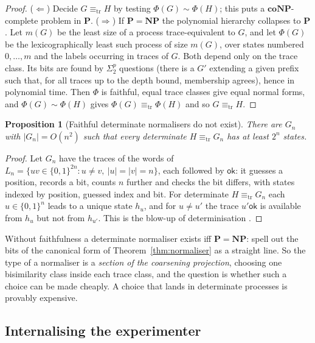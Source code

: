 \documentclass[11pt]{article}
\theoremstyle{definition}
\theoremstyle{plain}
\newtheorem{proposition}[definition]{Proposition}
\theoremstyle{remark}
\newcommand{\sbisim}{\sim}
\newcommand{\treq}{\equiv_{\mathrm{tr}}}
\newcommand{\ok}{\mathsf{ok}}
\newcommand{\Pclass}{\mathbf{P}}
\newcommand{\NPclass}{\mathbf{NP}}
\newcommand{\coNP}{\mathbf{coNP}}
\begin{document}
\begin{proof}
($\Leftarrow$) Decide $G \treq H$ by testing $\Phi(G) \sbisim \Phi(H)$;
this puts a $\coNP$-complete problem in $\Pclass$. ($\Rightarrow$) If
$\Pclass = \NPclass$ the polynomial hierarchy collapses to $\Pclass$. Let
$m(G)$ be the least size of a process trace-equivalent to $G$, and let
$\Phi(G)$ be the lexicographically least such process of size $m(G)$,
over states numbered $0, \dots, m$ and the labels occurring in traces of
$G$. Both depend only on the trace class. Its bits are found by
$\Sigma^p_2$ questions (there is a $G'$ extending a given prefix such
that, for all traces up to the depth bound, membership agrees), hence in
polynomial time. Then $\Phi$ is faithful, equal trace classes give equal
normal forms, and $\Phi(G) \sbisim \Phi(H)$ gives $\Phi(G) \treq
\Phi(H)$ and so $G \treq H$.
\end{proof}

\begin{proposition}[Faithful determinate normalisers do not exist]
\label{prop:determinate}
There are $G_n$ with $|G_n| = O(n^2)$ such that every determinate $H
\treq G_n$ has at least $2^n$ states.
\end{proposition}

\begin{proof}
Let $G_n$ have the traces of the words of $L_n = \{uv \in \{0,1\}^{2n} :
u \neq v,\ |u| = |v| = n\}$, each followed by $\ok$: it guesses a
position, records a bit, counts $n$ further and checks the bit differs,
with states indexed by position, guessed index and bit. For determinate
$H \treq G_n$ each $u \in \{0,1\}^n$ leads to a unique state $h_u$, and
for $u \neq u'$ the trace $u'\ok$ is available from $h_u$ but not from
$h_{u'}$. This is the blow-up of determinisation
\cite{MeyerFischer71,Moore71}.
\end{proof}

Without faithfulness a determinate normaliser exists iff $\Pclass =
\NPclass$: spell out the bits of the canonical form of
Theorem~\ref{thm:normaliser} as a straight line. So the type of a
normaliser is a \emph{section of the coarsening projection}, choosing one
bisimilarity class inside each trace class, and the question is whether
such a choice can be made cheaply. A choice that lands in determinate
processes is provably expensive.

\subsection{Internalising the experimenter}\label{sec:internal}
\end{document}
